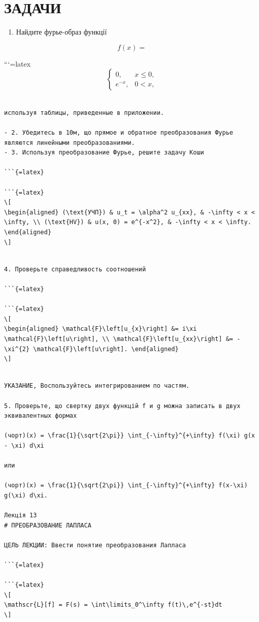 \documentclass[
]{article}
\providecommand{\tightlist}{%
  \setlength{\itemsep}{0pt}\setlength{\parskip}{0pt}}
\begin{document}
\section{ЗАДАЧИ}\label{ux437ux430ux434ux430ux447ux438-1}

\begin{enumerate}
\def\labelenumi{\arabic{enumi}.}
\tightlist
\item
  Найдите фурье-образ функції
\end{enumerate}

\[
f(x) =
\]

```{=latex}
\[
\begin{cases} 0, & x \leq 0, \\ e^{-x}, & 0 < x, \end{cases}
\]

\begin{verbatim}

используя таблицы, приведенные в приложении.

- 2. Убедитесь в 10м, що прямое и обратное преобразования Фурье являются линейными преобразованиями.
- 3. Используя преобразование Фурье, решите задачу Коши

```{=latex}

```{=latex}
\[
\begin{aligned} (\text{УЧП}) & u_t = \alpha^2 u_{xx}, & -\infty < x < \infty, \\ (\text{HV}) & u(x, 0) = e^{-x^2}, & -\infty < x < \infty. \end{aligned}
\]
\end{verbatim}

\begin{verbatim}

4. Проверьте справедливость соотношений

```{=latex}

```{=latex}
\[
\begin{aligned} \mathcal{F}\left[u_{x}\right] &= i\xi \mathcal{F}\left[u\right], \\ \mathcal{F}\left[u_{xx}\right] &= -\xi^{2} \mathcal{F}\left[u\right]. \end{aligned}
\]
\end{verbatim}

\begin{verbatim}

УКАЗАНИЕ, Воспользуйтесь интегрированием по частям.

5. Проверьте, що свертку двух функцій f и g можна записать в двух эквивалентных формах

(чорт)(x) = \frac{1}{\sqrt{2\pi}} \int_{-\infty}^{+\infty} f(\xi) g(x - \xi) d\xi

или

(чорт)(x) = \frac{1}{\sqrt{2\pi}} \int_{-\infty}^{+\infty} f(x-\xi) g(\xi) d\xi.

Лекція 13
# ПРЕОБРАЗОВАНИЕ ЛАПЛАСА

ЦЕЛЬ ЛЕКЦИИ: Ввести понятие преобразования Лапласа

```{=latex}

```{=latex}
\[
\mathscr{L}[f] = F(s) = \int\limits_0^\infty f(t)\,e^{-st}dt
\]
\end{verbatim}
\end{document}
